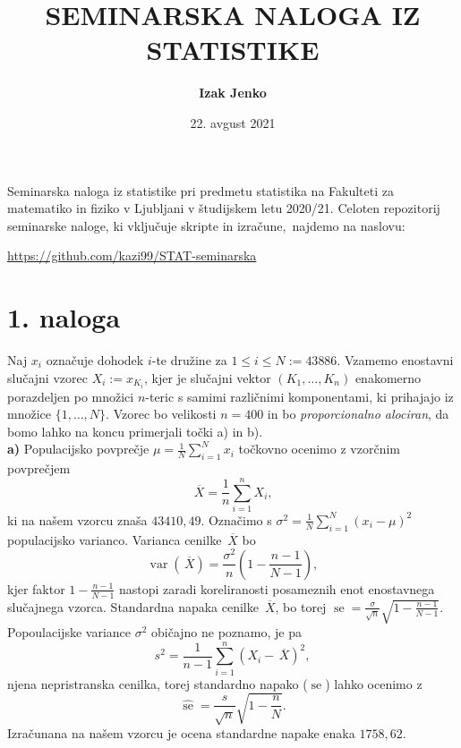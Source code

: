 \documentclass[a4paper,11pt]{article}
\newcommand{\olsi}[1]{\,\overline{\!{#1}}} %
\newcommand{\sumin}{\sum_{i = 1}^n}
\renewcommand{\var}[1]{\operatorname{var}(#1)}
\DeclareMathOperator{\se}{se}
\begin{document}
    
\author{\textbf{Izak Jenko}}
\title{SEMINARSKA NALOGA IZ STATISTIKE}
\date{22. avgust 2021}

\maketitle
\thispagestyle{empty}

\par
Seminarska naloga iz statistike pri predmetu statistika na Fakulteti za matematiko in fiziko v Ljubljani v študijskem letu 2020/21. Celoten repozitorij seminarske naloge, ki vključuje skripte in izračune, najdemo na naslovu:
\begin{center}
    \url{https://github.com/kazi99/STAT-seminarska} 
\end{center}

\section*{1. naloga}

Naj $x_i$ označuje dohodek $i$-te družine za $1 \leq i \leq N := 43 886$. Vzamemo enostavni slučajni vzorec $X_i := x_{K_i}$, kjer je slučajni vektor $(K_1, \ldots, K_n)$ enakomerno porazdeljen po množici $n$-teric s samimi različnimi komponentami, ki prihajajo iz množice $\{ 1, \dots, N\}$. Vzorec bo velikosti $n = 400$ in bo \emph{proporcionalno alociran}, da bomo lahko na koncu primerjali točki a) in b).
\\

\noindent
\textbf{a)} Populacijsko povprečje $\mu = \frac1N \sum_{i=1}^N x_i$ točkovno ocenimo z vzorčnim povprečjem
\[
    \olsi{X} = \frac1n \sum_{i = 1}^n X_i,  
\]
ki na našem vzorcu znaša $43410,49$. Označimo s $\sigma^2 = \frac{1}{N}\sum_{i = 1}^N (x_i - \mu)^2$ populacijsko varianco. Varianca cenilke $\olsi{X}$ bo 
\[
    \var{\olsi{X}} = \frac{\sigma^2}{n}\left(1 - \frac{n-1}{N-1}\right),
\]
kjer faktor $1 - \frac{n-1}{N-1}$ nastopi zaradi koreliranosti posameznih enot enostavnega slučajnega vzorca. Standardna napaka cenilke $\olsi{X}$, bo torej $\se = \frac{\sigma}{\sqrt{n}} \sqrt{1 - \frac{n-1}{N-1}}$. Popoulacijske variance $\sigma^2$ običajno ne poznamo, je pa 
\[
    s^2 = \frac{1}{n-1}\sumin(X_i - \olsi{X})^2, 
\]
njena nepristranska cenilka, torej standardno napako ($\se$) lahko ocenimo z
\[
    \hat{\se} = \frac{s}{\sqrt{n}}\sqrt{1 - \frac{n}{N}}.
\]
Izračunana na našem vzorcu je ocena standardne napake enaka $1758,62$.
\end{document}
